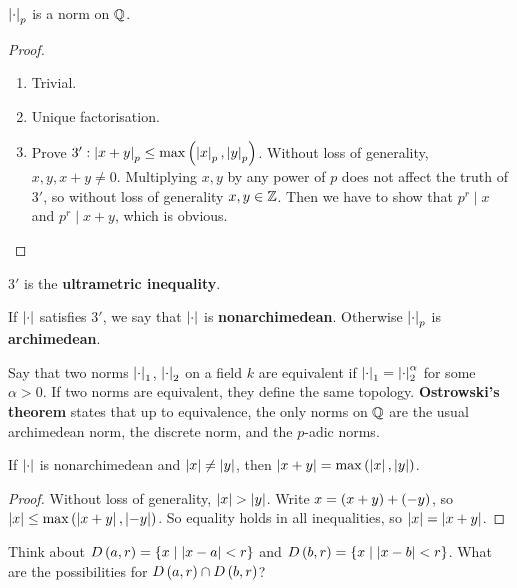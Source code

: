 \begin{lemma}
$ \left\lvert \cdot \right\rvert_p $ is a norm on $ \mathbb{Q} $.
\end{lemma}

\begin{proof}
\hfill
\begin{enumerate}
\item Trivial.
\item Unique factorisation.
\item Prove $ 3' : \left\lvert x + y \right\rvert_p \le \max\left( \left\lvert x \right\rvert_p, \left\lvert y \right\rvert_p \right) $. Without loss of generality, $ x, y, x + y \ne 0 $. Multiplying $ x, y $ by any power of $ p $ does not affect the truth of $ 3' $, so without loss of generality $ x, y \in \mathbb{Z} $. Then we have to show that $ p^r \mid x $ and $ p^r \mid x + y $, which is obvious.
\end{enumerate}
\end{proof}

$ 3' $ is the \textbf{ultrametric inequality}.

\begin{definition}
If $ \left\lvert \cdot \right\rvert $ satisfies $ 3' $, we say that $ \left\lvert \cdot \right\rvert $ is \textbf{nonarchimedean}. Otherwise $ \left\lvert \cdot \right\rvert_p $ is \textbf{archimedean}.
\end{definition}

Say that two norms $ \left\lvert \cdot \right\rvert_1 $, $ \left\lvert \cdot \right\rvert_2 $ on a field $ k $ are equivalent if $ \left\lvert \cdot \right\rvert_1 = \left\lvert \cdot \right\rvert_2^\alpha $ for some $ \alpha > 0 $. If two norms are equivalent, they define the same topology. \textbf{Ostrowski's theorem} states that up to equivalence, the only norms on $ \mathbb{Q} $ are the usual archimedean norm, the discrete norm, and the $ p $-adic norms.


\begin{lemma}
\label{lem:1.6}
If $ \left\lvert \cdot \right\rvert $ is nonarchimedean and $ \left\lvert x \right\rvert \ne \left\lvert y \right\rvert $, then $ \left\lvert x + y \right\rvert = \max\left( \left\lvert x \right\rvert, \left\lvert y \right\rvert \right) $.
\end{lemma}

\begin{proof}
Without loss of generality, $ \left\lvert x \right\rvert > \left\lvert y \right\rvert $. Write $ x = \left( x + y \right) + \left( -y \right) $, so $ \left\lvert x \right\rvert \le \max\left( \left\lvert x + y \right\rvert, \left\lvert -y \right\rvert \right) $. So equality holds in all inequalities, so $ \left\lvert x \right\rvert = \left\lvert x + y \right\rvert $.
\end{proof}

\begin{example*}
Think about $ D\left( a, r \right) = \left\{ x \mid \left\lvert x - a \right\rvert < r \right\} $ and $ D\left( b, r \right) = \left\{ x \mid \left\lvert x - b \right\rvert < r \right\} $. What are the possibilities for $ D\left( a, r \right) \cap D\left( b, r \right) $?
\end{example*}

